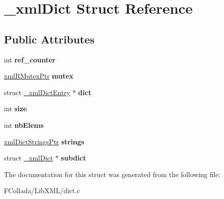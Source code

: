 \hypertarget{struct__xmlDict}{
\section{\_\-xmlDict Struct Reference}
\label{struct__xmlDict}
}
\subsection*{Public Attributes}
\begin{DoxyCompactItemize}
\item 
\hypertarget{struct__xmlDict_a621007f2c0e2dfa8c6b2254362993b6b}{
int {\bfseries ref\_\-counter}}
\label{struct__xmlDict_a621007f2c0e2dfa8c6b2254362993b6b}

\item 
\hypertarget{struct__xmlDict_a7c9f35a2039d9ae2c8da9916baa46d2a}{
\hyperlink{struct__xmlRMutex}{xmlRMutexPtr} {\bfseries mutex}}
\label{struct__xmlDict_a7c9f35a2039d9ae2c8da9916baa46d2a}

\item 
\hypertarget{struct__xmlDict_a24009f3113bebc8f3cad21327680433b}{
struct \hyperlink{struct__xmlDictEntry}{\_\-xmlDictEntry} $\ast$ {\bfseries dict}}
\label{struct__xmlDict_a24009f3113bebc8f3cad21327680433b}

\item 
\hypertarget{struct__xmlDict_a36121e716acc2b7e35dd445fc172469e}{
int {\bfseries size}}
\label{struct__xmlDict_a36121e716acc2b7e35dd445fc172469e}

\item 
\hypertarget{struct__xmlDict_a134090e41bca810751985cb399882268}{
int {\bfseries nbElems}}
\label{struct__xmlDict_a134090e41bca810751985cb399882268}

\item 
\hypertarget{struct__xmlDict_a3f38eb554703d6fe9e217b6642227835}{
\hyperlink{struct__xmlDictStrings}{xmlDictStringsPtr} {\bfseries strings}}
\label{struct__xmlDict_a3f38eb554703d6fe9e217b6642227835}

\item 
\hypertarget{struct__xmlDict_a4bfaf29c3961e1b71cd6d0d853ff2748}{
struct \hyperlink{struct__xmlDict}{\_\-xmlDict} $\ast$ {\bfseries subdict}}
\label{struct__xmlDict_a4bfaf29c3961e1b71cd6d0d853ff2748}

\end{DoxyCompactItemize}


The documentation for this struct was generated from the following file:\begin{DoxyCompactItemize}
\item 
FCollada/LibXML/dict.c\end{DoxyCompactItemize}
